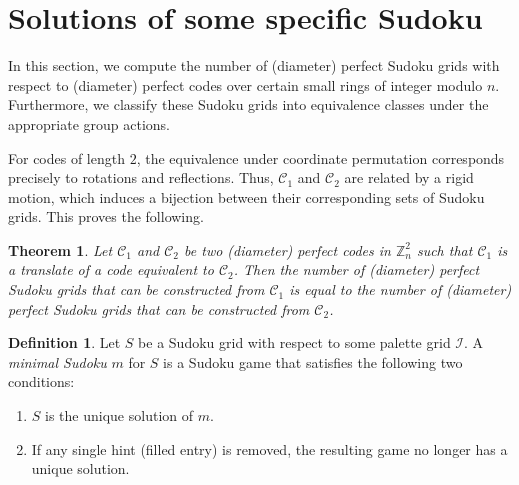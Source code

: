 \documentclass{article}
\newtheorem{theorem}{Theorem}[section]
\theoremstyle{definition}
\newtheorem{definition}{Definition}[section]
\begin{document}
\section{Solutions of some specific Sudoku}
In this section, we compute the number of (diameter) perfect Sudoku grids with respect to (diameter) perfect codes over certain small rings of integer modulo $n$. Furthermore, we classify these Sudoku grids into equivalence classes under the appropriate group actions.

For codes of length $2$, the equivalence under coordinate permutation corresponds precisely to rotations and reflections. Thus, $\mathcal{C}_1$ and $\mathcal{C}_2$ are related by a rigid motion, which induces a bijection between their corresponding sets of Sudoku grids. This proves the following.

\begin{theorem}\label{eqcode}
Let $\mathcal{C}_1$ and $\mathcal{C}_2$ be two (diameter) perfect codes in $\mathbb{Z}_n^2$ such that $\mathcal{C}_1$ is a translate of a code equivalent to $\mathcal{C}_2$. Then the number of (diameter) perfect Sudoku grids that can be constructed from $\mathcal{C}_1$ is equal to the number of (diameter) perfect Sudoku grids that can be constructed from $\mathcal{C}_2$.
\end{theorem}



\begin{definition}
Let $S$ be a Sudoku grid with respect to some palette grid $\mathcal{I}$. A \textit{minimal Sudoku} $m$ for $S$ is a Sudoku game that satisfies the following two conditions:
\begin{enumerate}
\item[(i)] $S$ is the unique solution of $m$.
\item[(ii)] If any single hint (filled entry) is removed, the resulting game no longer has a unique solution.
\end{enumerate}
\end{definition}
\end{document}
